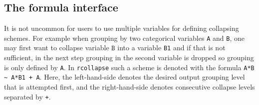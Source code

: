 \documentclass[11pt, fleqn]{article}
\begin{document}
\subsection{The formula interface}
It is not uncommon for users to use multiple variables for defining collapsing
schemes. For example when grouping by two categorical variables \texttt{A} and
\texttt{B}, one may first want to collapse variable $\texttt{B}$ into a
variable \texttt{B1} and if that is not sufficient, in the next step grouping
in the second variable is dropped so grouping is only defined by \texttt{A}.
In \texttt{rcollapse} such a scheme is denoted with the formula \texttt{A*B \~{}
A*B1 + A}. Here, the left-hand-side denotes the desired output grouping level
that is attempted first, and the right-hand-side denotes consecutive collapse
levels separated by \texttt{+}.
\end{document}
